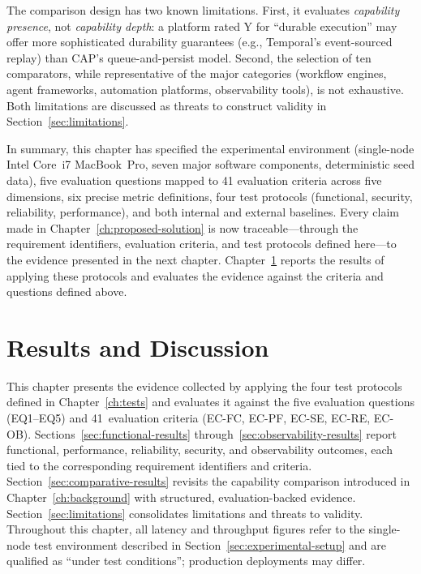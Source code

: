 \documentclass[a4paper,noexaminfo]{sapthesis}
\begin{document}
The comparison design has two known limitations.  First, it evaluates
\emph{capability presence}, not \emph{capability depth}: a platform rated
Y for ``durable execution'' may offer more sophisticated durability
guarantees (e.g., Temporal's event-sourced replay) than CAP's
queue-and-persist model.  Second, the selection of ten comparators,
while representative of the major categories (workflow engines, agent
frameworks, automation platforms, observability tools), is not exhaustive.
Both limitations are discussed as threats to construct validity in
Section~\ref{sec:limitations}.

\medskip
\noindent
In summary, this chapter has specified the experimental environment
(single-node Intel Core~i7 MacBook~Pro, seven major software components, deterministic
seed data), five evaluation questions mapped to 41 evaluation criteria
across five dimensions, six precise metric definitions, four test
protocols (functional, security, reliability, performance), and both
internal and external baselines.  Every claim made in
Chapter~\ref{ch:proposed-solution} is now traceable---through the
requirement identifiers, evaluation criteria, and test protocols defined
here---to the evidence presented in the next chapter.
Chapter~\ref{ch:results} reports the results of applying these protocols
and evaluates the evidence against the criteria and questions defined
above.


\chapter{Results and Discussion}
\label{ch:results}

This chapter presents the evidence collected by applying the four test
protocols defined in Chapter~\ref{ch:tests} and evaluates it against the
five evaluation questions (EQ1--EQ5) and 41~evaluation criteria
(EC-FC, EC-PF, EC-SE, EC-RE, EC-OB).  Sections~\ref{sec:functional-results}
through~\ref{sec:observability-results} report functional, performance,
reliability, security, and observability outcomes, each tied to the
corresponding requirement identifiers and criteria.
Section~\ref{sec:comparative-results} revisits the capability comparison
introduced in Chapter~\ref{ch:background} with structured,
evaluation-backed evidence.
Section~\ref{sec:limitations} consolidates limitations and threats to
validity.  Throughout this chapter, all latency and throughput figures
refer to the single-node test environment described in
Section~\ref{sec:experimental-setup} and are qualified as ``under test
conditions''; production deployments may differ.
\end{document}
